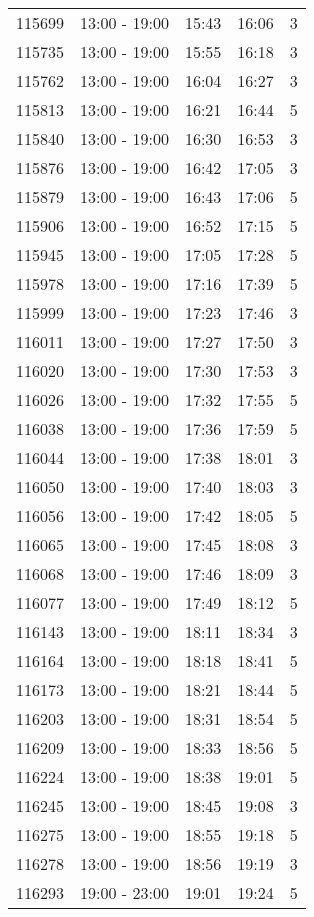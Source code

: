\documentclass{article}
\begin{document}
\begin{tabular}{llccc}
115699 & 13:00 - 19:00 & 15:43 & 16:06 & 3 \\
115735 & 13:00 - 19:00 & 15:55 & 16:18 & 3 \\
115762 & 13:00 - 19:00 & 16:04 & 16:27 & 3 \\
115813 & 13:00 - 19:00 & 16:21 & 16:44 & 5 \\
115840 & 13:00 - 19:00 & 16:30 & 16:53 & 3 \\
115876 & 13:00 - 19:00 & 16:42 & 17:05 & 3 \\
115879 & 13:00 - 19:00 & 16:43 & 17:06 & 5 \\
115906 & 13:00 - 19:00 & 16:52 & 17:15 & 5 \\
115945 & 13:00 - 19:00 & 17:05 & 17:28 & 5 \\
115978 & 13:00 - 19:00 & 17:16 & 17:39 & 5 \\
115999 & 13:00 - 19:00 & 17:23 & 17:46 & 3 \\
116011 & 13:00 - 19:00 & 17:27 & 17:50 & 3 \\
116020 & 13:00 - 19:00 & 17:30 & 17:53 & 3 \\
116026 & 13:00 - 19:00 & 17:32 & 17:55 & 5 \\
116038 & 13:00 - 19:00 & 17:36 & 17:59 & 5 \\
116044 & 13:00 - 19:00 & 17:38 & 18:01 & 3 \\
116050 & 13:00 - 19:00 & 17:40 & 18:03 & 3 \\
116056 & 13:00 - 19:00 & 17:42 & 18:05 & 5 \\
116065 & 13:00 - 19:00 & 17:45 & 18:08 & 3 \\
116068 & 13:00 - 19:00 & 17:46 & 18:09 & 3 \\
116077 & 13:00 - 19:00 & 17:49 & 18:12 & 5 \\
116143 & 13:00 - 19:00 & 18:11 & 18:34 & 3 \\
116164 & 13:00 - 19:00 & 18:18 & 18:41 & 5 \\
116173 & 13:00 - 19:00 & 18:21 & 18:44 & 5 \\
116203 & 13:00 - 19:00 & 18:31 & 18:54 & 5 \\
116209 & 13:00 - 19:00 & 18:33 & 18:56 & 5 \\
116224 & 13:00 - 19:00 & 18:38 & 19:01 & 5 \\
116245 & 13:00 - 19:00 & 18:45 & 19:08 & 3 \\
116275 & 13:00 - 19:00 & 18:55 & 19:18 & 5 \\
116278 & 13:00 - 19:00 & 18:56 & 19:19 & 3 \\
116293 & 19:00 - 23:00 & 19:01 & 19:24 & 5 \\

\end{tabular}
\end{document}
